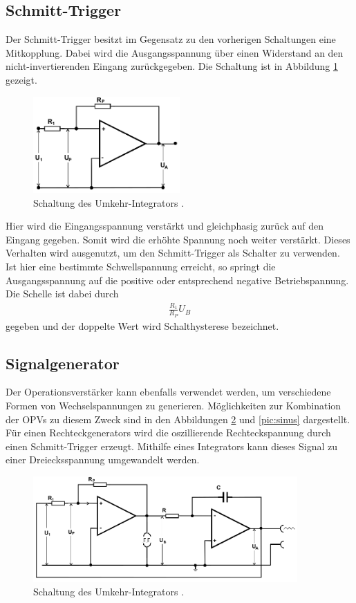 \subsection{Schmitt-Trigger}
Der Schmitt-Trigger besitzt im Gegensatz zu
den vorherigen Schaltungen eine Mitkopplung. 
Dabei wird die Ausgangsspannung über
einen Widerstand an den nicht-invertierenden
Eingang zurückgegeben. Die Schaltung ist in
Abbildung \ref{pic:schmitt} gezeigt. 
\begin{figure}[t]
 \includegraphics[width = 0.5\textwidth]{../pics/schmitt.png}
 \caption{Schaltung des Umkehr-Integrators \cite{Anl}.}
 \label{pic:schmitt}
\end{figure}
Hier wird die Eingangsspannung 
verstärkt und gleichphasig zurück auf
den Eingang gegeben. Somit wird die erhöhte
Spannung noch weiter verstärkt. Dieses Verhalten 
wird ausgenutzt, um den Schmitt-Trigger
als Schalter zu verwenden. Ist hier eine bestimmte 
Schwellspannung erreicht, so springt
die Ausgangsspannung auf die positive oder
entsprechend negative Betriebspannung. Die
Schelle ist dabei durch
\begin{align}
 \frac{R_1}{R_P} U_B
\end{align}
gegeben und der doppelte Wert wird Schalthysterese bezeichnet.

\subsection{Signalgenerator}
Der Operationsverstärker kann ebenfalls verwendet werden, um verschiedene Formen
von Wechselspannungen zu generieren. Möglichkeiten zur Kombination der OPVs 
zu diesem Zweck sind in den Abbildungen \ref{pic:dreiRect}
und \ref{pic:sinus} dargestellt.
Für einen Rechteckgenerators wird die oszillierende Rechteckspannung durch einen
Schmitt-Trigger erzeugt. Mithilfe eines Integrators kann dieses Signal 
zu einer Dreiecksspannung umgewandelt werden.

\begin{figure}[t]
 \includegraphics[width = 0.9\textwidth]{../pics/DreiRect.png}
 \caption{Schaltung des Umkehr-Integrators \cite{Anl}.}
 \label{pic:dreiRect}
\end{figure}

